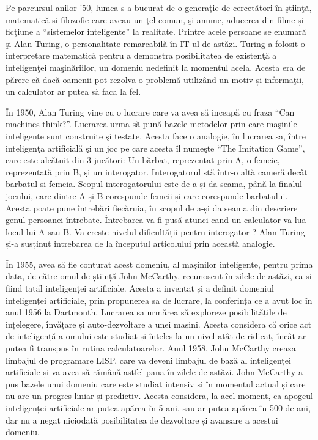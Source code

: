 	Pe parcursul anilor '50, lumea s-a bucurat de o generaţie de cercetători în ştiinţă, matematică si filozofie care aveau un ţel comun, şi anume, aducerea din filme și ficţiune a “sistemelor inteligente” la realitate. Printre acele persoane se enumară şi Alan Turing, o personalitate remarcabilă în IT-ul de astăzi. Turing a folosit o interpretare matematică pentru a demonstra posibilitatea de existenţă a inteligenţei maşinăriilor, un domeniu nedefinit la momentul acela. Acesta era de părere că dacă oamenii pot rezolva o problemă utilizând un motiv și informaţii, un calculator ar putea să facă la fel. \cite{ai_history}
	
	În 1950, Alan Turing vine cu o lucrare care va avea să inceapă cu fraza “Can machines think?”. Lucrarea urma să pună bazele metodelor prin care maşinile inteligente sunt construite şi testate. Acesta face o analogie, în lucrarea sa, între inteligenţa artificială şi un joc pe care acesta îl numeşte “The Imitation Game”, care este alcătuit din 3 jucători: Un bărbat, reprezentat prin A, o femeie, reprezentată prin B, şi un interogator. Interogatorul stă într-o altă cameră decât barbatul și femeia. Scopul interogatorului este de a-și da seama, până la finalul jocului, care dintre A și B corespunde femeii și care corespunde barbatului. Acesta poate pune întrebări fiecăruia, în scopul de a-și da seama din descriere genul persoanei întrebate. Întrebarea va fi pusă atunci cand un calculator va lua locul lui A sau B. Va creste nivelul dificultății pentru interogator ? Alan Turing și-a susținut intrebarea de la începutul  articolului prin această analogie. \cite{turing}
	
	În 1955, avea să fie conturat acest domeniu, al mașinilor inteligente, pentru prima data, de către omul de știință John McCarthy, recunoscut în zilele de astăzi, ca si fiind tatăl inteligenței artificiale. Acesta a inventat și a definit domeniul inteligenței artificiale, prin propunerea sa de lucrare, la conferința ce a avut loc în anul 1956 la Dartmouth. Lucrarea sa urmărea să exploreze posibilitățile de ințelegere, învățare și auto-dezvoltare a unei mașini. Acesta considera că orice act de inteligență a omului este studiat și  înteles la un nivel atât de ridicat,  încât ar putea fi transpus în rutina calculatoarelor. Anul 1958, John McCarthy creaza limbajul de programare LISP, care va deveni limbajul de bază al inteligenței artificiale și va avea să rămână astfel pana în zilele de astăzi. 
	John McCarthy a pus bazele unui domeniu care este studiat intensiv si în momentul actual și care nu are un progres liniar și predictiv. Acesta considera, la acel moment, ca apogeul inteligenței artificiale ar putea apărea în 5 ani, sau ar putea apărea în 500 de ani, dar nu a negat niciodată posibilitatea de dezvoltare și avansare a acestui domeniu. \cite{mccarthy_proposal}
	
